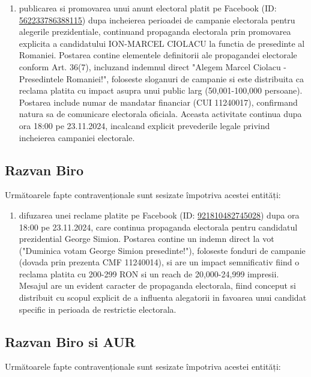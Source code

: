 \documentclass[a4paper,12pt]{article}
\begin{document}
\begin{enumerate}[leftmargin=*, label=\arabic*.)]
    \item publicarea si promovarea unui anunt electoral platit pe Facebook (ID: \href{https://www.facebook.com/ads/library/?id=562233786388115}{562233786388115}) dupa incheierea perioadei de campanie electorala pentru alegerile prezidentiale, continuand propaganda electorala prin promovarea explicita a candidatului ION-MARCEL CIOLACU la functia de presedinte al Romaniei. Postarea contine elementele definitorii ale propagandei electorale conform Art. 36(7), incluzand indemnul direct "Alegem Marcel Ciolacu - Presedintele Romaniei!", foloseste sloganuri de campanie si este distribuita ca reclama platita cu impact asupra unui public larg (50,001-100,000 persoane). Postarea include numar de mandatar financiar (CUI 11240017), confirmand natura sa de comunicare electorala oficiala. Aceasta activitate continua dupa ora 18:00 pe 23.11.2024, incalcand explicit prevederile legale privind incheierea campaniei electorale.
\end{enumerate}

\vspace{0.5cm}

\subsection{Razvan Biro}
Următoarele fapte contravenționale sunt sesizate împotriva acestei entități:

\begin{enumerate}[leftmargin=*, label=\arabic*.)]
    \item difuzarea unei reclame platite pe Facebook (ID: \href{https://www.facebook.com/ads/library/?id=921810482745028}{921810482745028}) dupa ora 18:00 pe 23.11.2024, care continua propaganda electorala pentru candidatul prezidential George Simion. Postarea contine un indemn direct la vot ("Duminica votam George Simion presedinte!"), foloseste fonduri de campanie (dovada prin prezenta CMF 11240014), si are un impact semnificativ fiind o reclama platita cu 200-299 RON si un reach de 20,000-24,999 impresii. Mesajul are un evident caracter de propaganda electorala, fiind conceput si distribuit cu scopul explicit de a influenta alegatorii in favoarea unui candidat specific in perioada de restrictie electorala.
\end{enumerate}

\vspace{0.5cm}

\subsection{Razvan Biro si AUR}
Următoarele fapte contravenționale sunt sesizate împotriva acestei entități:
\end{document}
